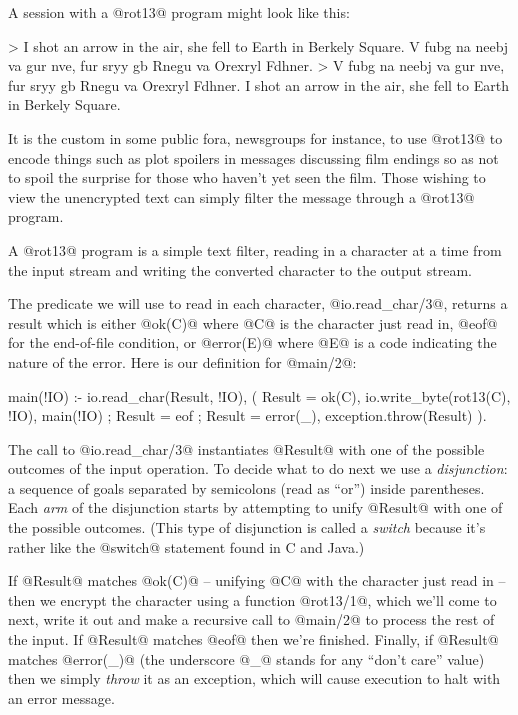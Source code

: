 A session with a @rot13@ program might look like this:
\begin{myverbatim}
> I shot an arrow in the air, she fell to Earth in Berkely Square.
  V fubg na neebj va gur nve, fur sryy gb Rnegu va Orexryl Fdhner.
> V fubg na neebj va gur nve, fur sryy gb Rnegu va Orexryl Fdhner.
  I shot an arrow in the air, she fell to Earth in Berkely Square.
\end{myverbatim}

It is the custom in some public fora, newsgroups for instance, to use
@rot13@ to encode things such as plot spoilers in messages discussing film
endings so as not to spoil the surprise for those who haven't yet seen the
film.  Those wishing to view the unencrypted text can simply filter the
message through a @rot13@ program.

A @rot13@ program is a simple text filter, reading in a character at a time
from the input stream and writing the converted character to the output
stream.

The predicate we will use to read in each character, @io.read_char/3@,
returns a result which is either @ok(C)@ where @C@ is the character just
read in, @eof@ for the end-of-file condition, or @error(E)@ where @E@ is a
code indicating the nature of the error.  Here is our definition for
@main/2@:
\begin{myverbatim}
main(!IO) :-
    io.read_char(Result, !IO),
    (
        Result = ok(C),
        io.write_byte(rot13(C), !IO),
        main(!IO)
    ;
        Result = eof
    ;
        Result = error(_),
        exception.throw(Result)
    ).
\end{myverbatim}
The call to @io.read_char/3@ instantiates @Result@ with one of the
possible outcomes of the input operation.  To decide what to do next we
use a \emph{disjunction}: a sequence of goals separated by
semicolons (read as ``or'') inside parentheses.  Each
\emph{arm} of the disjunction starts by attempting to unify @Result@
with one of the possible outcomes.  (This type of disjunction is called a
\emph{switch} because it's rather like the @switch@ statement found in C and
Java.)

If @Result@ matches @ok(C)@ -- unifying @C@ with the character just read
in -- then we encrypt the character using a function @rot13/1@, which we'll
come to next, write it out and make a recursive call to @main/2@ to process
the rest of the input.  If @Result@ matches @eof@ then we're finished.
Finally, if @Result@ matches @error(_)@ (the underscore @_@ stands for any
``don't care'' value) then we simply \emph{throw} it as an exception, which
will cause execution to halt with an error message.

